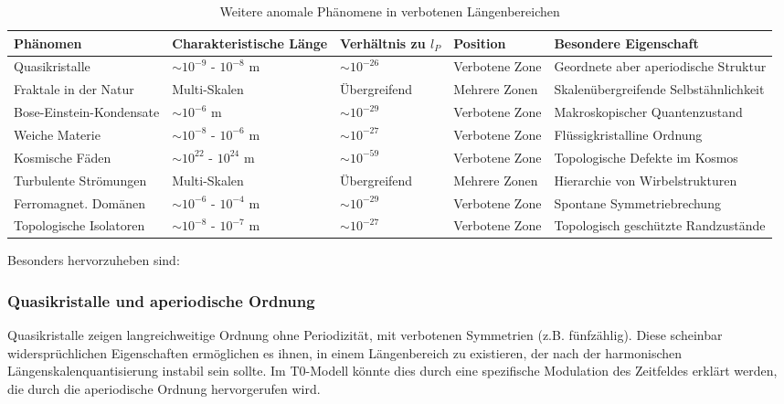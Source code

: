 \documentclass[12pt,a4paper]{article}
\begin{document}
	\begin{table}[h]
		\centering
		\begin{adjustbox}{scale=0.65}
			\begin{tabular}{lllll}
				\hline
				\textbf{Phänomen} & \textbf{Charakteristische Länge} & \textbf{Verhältnis zu $l_P$} & \textbf{Position} & \textbf{Besondere Eigenschaft} \\
				\hline
				Quasikristalle & $\sim 10^{-9}$ - $10^{-8}$ m & $\sim 10^{-26}$ & Verbotene Zone & Geordnete aber aperiodische Struktur \\
				Fraktale in der Natur & Multi-Skalen & Übergreifend & Mehrere Zonen & Skalenübergreifende Selbstähnlichkeit \\
				Bose-Einstein-Kondensate & $\sim 10^{-6}$ m & $\sim 10^{-29}$ & Verbotene Zone & Makroskopischer Quantenzustand \\
				Weiche Materie & $\sim 10^{-8}$ - $10^{-6}$ m & $\sim 10^{-27}$ & Verbotene Zone & Flüssigkristalline Ordnung \\
				Kosmische Fäden & $\sim 10^{22}$ - $10^{24}$ m & $\sim 10^{-59}$ & Verbotene Zone & Topologische Defekte im Kosmos \\
				Turbulente Strömungen & Multi-Skalen & Übergreifend & Mehrere Zonen & Hierarchie von Wirbelstrukturen \\
				Ferromagnet. Domänen & $\sim 10^{-6}$ - $10^{-4}$ m & $\sim 10^{-29}$ & Verbotene Zone & Spontane Symmetriebrechung \\
				Topologische Isolatoren & $\sim 10^{-8}$ - $10^{-7}$ m & $\sim 10^{-27}$ & Verbotene Zone & Topologisch geschützte Randzustände \\
				\hline
			\end{tabular}
		\end{adjustbox}
		\caption{Weitere anomale Phänomene in verbotenen Längenbereichen}
		\label{tab:more_anomalies}
	\end{table}
	
	Besonders hervorzuheben sind:
	
	\subsubsection{Quasikristalle und aperiodische Ordnung}
	
	Quasikristalle zeigen langreichweitige Ordnung ohne Periodizität, mit verbotenen Symmetrien (z.B. fünfzählig). Diese scheinbar widersprüchlichen Eigenschaften ermöglichen es ihnen, in einem Längenbereich zu existieren, der nach der harmonischen Längenskalenquantisierung instabil sein sollte. Im T0-Modell könnte dies durch eine spezifische Modulation des Zeitfeldes erklärt werden, die durch die aperiodische Ordnung hervorgerufen wird.
	
\end{document}
